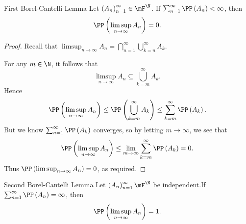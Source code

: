 \documentclass[stat901]{subfiles}
\begin{document}
    \begin{theorem}{First Borel-Cantelli Lemma}
        Let $\left( A_{n} \right)^{\infty}_{n=1}\in\mF^{\N}$. If $\sum^{\infty}_{n=1} \PP\left( A_n \right) < \infty$, then
        \begin{equation*}
            \PP\left( \limsup_{n\to\infty}A_n \right) = 0.
        \end{equation*}
    \end{theorem}

    \begin{proof}
        Recall that $\limsup_{n\to\infty} A_n = \bigcap^{\infty}_{n=1}\bigcup^{\infty}_{k=n}A_k$.

        For any $m\in\N$, it follows that
        \begin{equation*}
            \limsup_{n\to\infty} A_n \subseteq \bigcup^{\infty}_{k=m} A_k.
        \end{equation*}
        Hence
        \begin{equation*}
            \PP\left( \limsup_{n\to\infty}A_n \right) \leq \PP\left( \bigcup^{\infty}_{k=m}A_k \right) \leq \sum^{\infty}_{k=m} \PP\left( A_k \right).
        \end{equation*}
        But we know $\sum^{\infty}_{n=1} \PP\left( A_k \right)$ converges, so by letting $m\to\infty$, we see that
        \begin{equation*}
            \PP\left( \limsup_{n\to\infty}A_n \right) \leq \lim_{m\to\infty}\sum^{\infty}_{k=m}\PP\left( A_k \right) = 0.
        \end{equation*}
        Thus $\PP\left( \limsup_{n\to\infty}A_n \right)=0$, as required.
    \end{proof}

    \clearpage

    \begin{theorem}{Second Borel-Cantelli Lemma}
        Let $\left( A_{n} \right)^{\infty}_{n=1}\mF^{\N}$ be independent.\footnotemark[1] If $\sum^{\infty}_{n=1}\PP\left( A_n \right)=\infty$, then
        \begin{equation*}
            \PP\left( \limsup_{n\to\infty} A_n \right) = 1.
        \end{equation*}
        
        \noindent
        \begin{minipage}{\textwidth}
        \end{minipage}
    \end{theorem}
    
\end{document}
